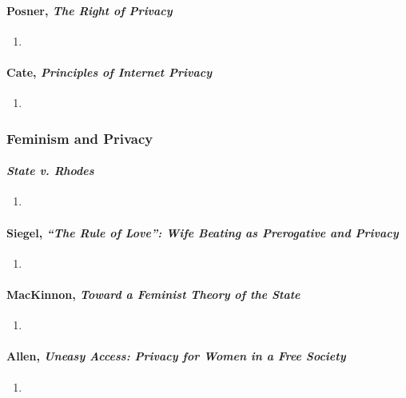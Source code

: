\paragraph{Posner, \emph{The Right of Privacy}}

\begin{enumerate}
    \item %
\end{enumerate}

\paragraph{Cate, \emph{Principles of Internet Privacy}}

\begin{enumerate}
    \item %
\end{enumerate}

\subsubsection{Feminism and Privacy}

\paragraph{\emph{State v. Rhodes}}

\begin{enumerate}
    \item %
\end{enumerate}

\paragraph{Siegel, \emph{``The Rule of Love'': Wife Beating as Prerogative and 
Privacy}}

\begin{enumerate}
    \item %
\end{enumerate}

\paragraph{MacKinnon, \emph{Toward a Feminist Theory of the State}}

\begin{enumerate}
    \item %
\end{enumerate}

\paragraph{Allen, \emph{Uneasy Access: Privacy for Women in a Free Society}}

\begin{enumerate}
    \item %
\end{enumerate}
